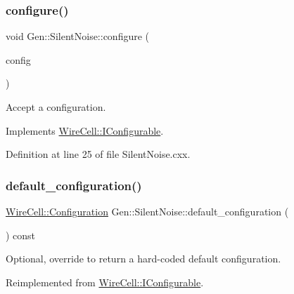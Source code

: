\subsubsection{\texorpdfstring{configure()}{configure()}}
{\footnotesize\ttfamily void Gen\+::\+Silent\+Noise\+::configure (\begin{DoxyParamCaption}\item[{const \hyperlink{namespace_wire_cell_a9f705541fc1d46c608b3d32c182333ee}{Wire\+Cell\+::\+Configuration} \&}]{config }\end{DoxyParamCaption})\hspace{0.3cm}{\ttfamily [virtual]}}



Accept a configuration. 



Implements \hyperlink{class_wire_cell_1_1_i_configurable_a57ff687923a724093df3de59c6ff237d}{Wire\+Cell\+::\+I\+Configurable}.



Definition at line 25 of file Silent\+Noise.\+cxx.

\mbox{\label{class_wire_cell_1_1_gen_1_1_silent_noise_adb72fd47827c62cb4a6634545fd62f87}} 
\subsubsection{\texorpdfstring{default\+\_\+configuration()}{default\_configuration()}}
{\footnotesize\ttfamily \hyperlink{namespace_wire_cell_a9f705541fc1d46c608b3d32c182333ee}{Wire\+Cell\+::\+Configuration} Gen\+::\+Silent\+Noise\+::default\+\_\+configuration (\begin{DoxyParamCaption}{ }\end{DoxyParamCaption}) const\hspace{0.3cm}{\ttfamily [virtual]}}



Optional, override to return a hard-\/coded default configuration. 



Reimplemented from \hyperlink{class_wire_cell_1_1_i_configurable_a54841b2da3d1ea02189478bff96f7998}{Wire\+Cell\+::\+I\+Configurable}.



